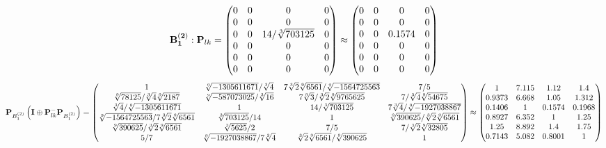 \documentclass[10pt,a4paper]{article}
\begin{document}
	\[
		\bold{B_1^{(2)}}: \bold{P}_{lk} = 
		\begin{pmatrix}
			{{0}}{} & {{0}}{} & {{0}}{} & {{0}}{} \\
			{{0}}{} & {{0}}{} & {{0}}{} & {{0}}{} \\
			{{0}}{} & {{0}}{} & {{14}} / {\sqrt[3]{703125}} & {{0}}{} \\
			{{0}}{} & {{0}}{} & {{0}}{} & {{0}}{} \\
			{{0}}{} & {{0}}{} & {{0}}{} & {{0}}{} \\
			{{0}}{} & {{0}}{} & {{0}}{} & {{0}}{} \\
		\end{pmatrix}
		\approx
		\begin{pmatrix}
			0        & 0        & 0        & 0        \\
			0        & 0        & 0        & 0        \\
			0        & 0        & 0.1574   & 0        \\
			0        & 0        & 0        & 0        \\
			0        & 0        & 0        & 0        \\
			0        & 0        & 0        & 0        \\
		\end{pmatrix}
	\]
	\[
		\bold{P}_{B_1^{(2)}}\left(\bold{I} \oplus \bold{P}_{lk}^{-}\bold{P}_{B_1^{(2)}}\right) = 
		\begin{pmatrix}
			{1}{} & {\sqrt[9]{-1305611671}} / {\sqrt[3]{4}} & {{7}\sqrt[3]{2}\sqrt[9]{6561}} / {\sqrt[9]{-1564725563}} & {{7}} / {{5}} \\
			{\sqrt[9]{78125}} / {\sqrt[3]{4}\sqrt[9]{2187}} & {\sqrt[9]{-587073025}} / {\sqrt[3]{16}} & {{7}\sqrt[9]{3}} / {\sqrt[3]{2}\sqrt[9]{9765625}} & {{7}} / {\sqrt[3]{4}\sqrt[9]{54675}} \\
			{\sqrt[3]{4}} / {\sqrt[9]{-1305611671}} & {1}{} & {{14}} / {\sqrt[3]{703125}} & {{7}\sqrt[3]{4}} / {\sqrt[9]{-1927038867}} \\
			{\sqrt[9]{-1564725563}} / {{7}\sqrt[3]{2}\sqrt[9]{6561}} & {\sqrt[3]{703125}} / {{14}} & {1}{} & {\sqrt[9]{390625}} / {\sqrt[3]{2}\sqrt[9]{6561}} \\
			{\sqrt[9]{390625}} / {\sqrt[3]{2}\sqrt[9]{6561}} & {\sqrt[3]{5625}} / {{2}} & {{7}} / {{5}} & {{7}} / {\sqrt[3]{2}\sqrt[9]{32805}} \\
			{{5}} / {{7}} & {\sqrt[9]{-1927038867}} / {{7}\sqrt[3]{4}} & {\sqrt[3]{2}\sqrt[9]{6561}} / {\sqrt[9]{390625}} & {1}{} \\
		\end{pmatrix}
		\approx
		\begin{pmatrix}
			1        & 7.115    & 1.12     & 1.4      \\
			0.9373   & 6.668    & 1.05     & 1.312    \\
			0.1406   & 1        & 0.1574   & 0.1968   \\
			0.8927   & 6.352    & 1        & 1.25     \\
			1.25     & 8.892    & 1.4      & 1.75     \\
			0.7143   & 5.082    & 0.8001   & 1        \\
		\end{pmatrix}
	\]
\end{document}
